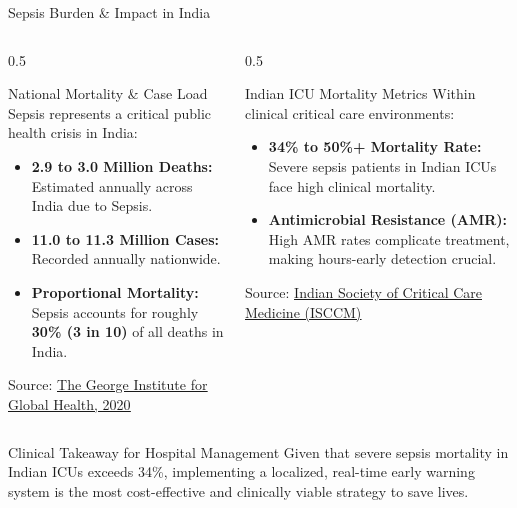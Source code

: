 \documentclass[aspectratio=169, 11pt]{beamer}
\begin{document}
\begin{frame}{Sepsis Burden \& Impact in India}
    \begin{columns}[t]
        \begin{column}{0.5\textwidth}
            \begin{block}{National Mortality \& Case Load}
                \scriptsize
                Sepsis represents a critical public health crisis in India:
                \begin{itemize}
                    \scriptsize
                    \item \textbf{2.9 to 3.0 Million Deaths:} Estimated annually across India due to Sepsis.
                    \item \textbf{11.0 to 11.3 Million Cases:} Recorded annually nationwide.
                    \item \textbf{Proportional Mortality:} Sepsis accounts for roughly \textbf{30\% (3 in 10)} of all deaths in India.
                \end{itemize}
                \vspace{0.1cm}
                Source: \href{https://www.georgeinstitute.org.in/projects/sepsis-in-india-prevalence-study-sips}{\textcolor{clinicTeal}{\underline{The George Institute for Global Health, 2020}}}
            \end{block}
        \end{column}
        
        \begin{column}{0.5\textwidth}
            \begin{block}{Indian ICU Mortality Metrics}
                \scriptsize
                Within clinical critical care environments:
                \begin{itemize}
                    \scriptsize
                    \item \textbf{34\% to 50\%+ Mortality Rate:} Severe sepsis patients in Indian ICUs face high clinical mortality.
                    \item \textbf{Antimicrobial Resistance (AMR):} High AMR rates complicate treatment, making hours-early detection crucial.
                \end{itemize}
                \vspace{0.1cm}
                Source: \href{https://pubmed.ncbi.nlm.nih.gov/30704986/}{\textcolor{clinicTeal}{\underline{Indian Society of Critical Care Medicine (ISCCM)}}}
            \end{block}
        \end{column}
    \end{columns}
    
    \begin{alertblock}{Clinical Takeaway for Hospital Management}
        \scriptsize
        Given that severe sepsis mortality in Indian ICUs exceeds 34\%, implementing a localized, real-time early warning system is the most cost-effective and clinically viable strategy to save lives.
    \end{alertblock}
\end{frame}
\end{document}
